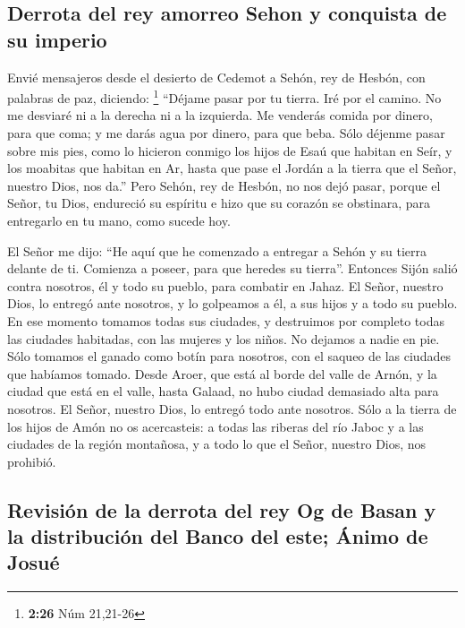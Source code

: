 \hypertarget{derrota-del-rey-amorreo-sehon-y-conquista-de-su-imperio}{%
\subsection{Derrota del rey amorreo Sehon y conquista de su
imperio}\label{derrota-del-rey-amorreo-sehon-y-conquista-de-su-imperio}}

 Envié mensajeros desde el desierto de Cedemot a Sehón,
rey de Hesbón, con palabras de paz, diciendo: \footnote{\textbf{2:26}
  Núm 21,21-26}  ``Déjame pasar por tu tierra. Iré por el
camino. No me desviaré ni a la derecha ni a la izquierda.
 Me venderás comida por dinero, para que coma; y me darás
agua por dinero, para que beba. Sólo déjenme pasar sobre mis pies,
 como lo hicieron conmigo los hijos de Esaú que habitan
en Seír, y los moabitas que habitan en Ar, hasta que pase el Jordán a la
tierra que el Señor, nuestro Dios, nos da.''  Pero Sehón,
rey de Hesbón, no nos dejó pasar, porque el Señor, tu Dios, endureció su
espíritu e hizo que su corazón se obstinara, para entregarlo en tu mano,
como sucede hoy.

 El Señor me dijo: ``He aquí que he comenzado a entregar
a Sehón y su tierra delante de ti. Comienza a poseer, para que heredes
su tierra''.  Entonces Sijón salió contra nosotros, él y
todo su pueblo, para combatir en Jahaz.  El Señor,
nuestro Dios, lo entregó ante nosotros, y lo golpeamos a él, a sus hijos
y a todo su pueblo.  En ese momento tomamos todas sus
ciudades, y destruimos por completo todas las ciudades habitadas, con
las mujeres y los niños. No dejamos a nadie en pie.  Sólo
tomamos el ganado como botín para nosotros, con el saqueo de las
ciudades que habíamos tomado.  Desde Aroer, que está al
borde del valle de Arnón, y la ciudad que está en el valle, hasta
Galaad, no hubo ciudad demasiado alta para nosotros. El Señor, nuestro
Dios, lo entregó todo ante nosotros.  Sólo a la tierra de
los hijos de Amón no os acercasteis: a todas las riberas del río Jaboc y
a las ciudades de la región montañosa, y a todo lo que el Señor, nuestro
Dios, nos prohibió.

\hypertarget{revisiuxf3n-de-la-derrota-del-rey-og-de-basan-y-la-distribuciuxf3n-del-banco-del-este-uxe1nimo-de-josuuxe9}{%
\subsection{Revisión de la derrota del rey Og de Basan y la distribución
del Banco del este; Ánimo de
Josué}\label{revisiuxf3n-de-la-derrota-del-rey-og-de-basan-y-la-distribuciuxf3n-del-banco-del-este-uxe1nimo-de-josuuxe9}}

